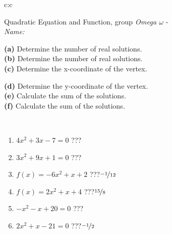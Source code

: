 \documentclass[10pt]{report}
\begin{document}
\begin{tabular}{c:c}
\begin{minipage}[c][104.5mm][t]{0.5\linewidth}
\begin{center}
\vspace{7mm}
{\huge {\LARGE Quadratic Equation and Function}, group \textit{Omega $\omega$} -}\\[5mm]
\textit{Name:}\phantom{xxxxxxxxxxxxxxxxxxxxxxxxxxxxxxxxxxxxxxxxxxxxxxxxxxxxxxxxxxxxxxxxx}\\[5mm]
\begin{minipage}{0.95\linewidth}
\begin{center}
{\small \begin{minipage}{0.5\textwidth}
\textbf{(a)} Determine the number of real solutions. \\[1mm]
\textbf{(b)} Determine the number of real solutions. \\[1mm]
\textbf{(c)} Determine the x-coordinate of the vertex.
\end{minipage} \begin{minipage}{0.49\textwidth}
\textbf{(d)} Determine the y-coordinate of the vertex. \\[1mm]
\textbf{(e)} Calculate the sum of the solutions. \\[1mm]
\textbf{(f)} Calculate the sum of the solutions.
\end{minipage}
}
\end{center}
\end{minipage}
\\[4mm]
\begin{minipage}{0.79\linewidth}
\begin{center}
\begin{varwidth}{\linewidth}
\begin{enumerate}
\Large
\item $4x^2+3x-7=0$\quad \dotfill\; ???\;\dotfill {}
\item $3x^2+9x+1=0$\quad \dotfill\; ???\;\dotfill {}
\item $f(x)=-6x^2+x+2$\quad \dotfill\; ???\;\dotfill \quad $\nicefrac{-1}{12}$
\item $f(x)=2x^2+x+4$\quad \dotfill\; ???\;\dotfill \quad $\nicefrac{15}{8}$
\item $-x^2-x+20=0$\quad \dotfill\; ???\;\dotfill {}
\item $2x^2+x-21=0$\quad \dotfill\; ???\;\dotfill \quad $\nicefrac{-1}{2}$
\end{enumerate}
\end{varwidth}

\end{center}
\end{minipage}
\end{center}
\end{minipage}
\end{tabular}
\end{document}

